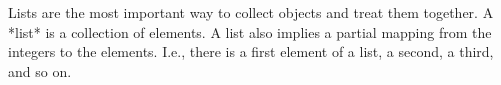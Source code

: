 %

Lists  are the  most  important way  to collect objects  and  treat  them
together.  A *list* is a collection  of elements.  A list  also implies a
partial mapping from the integers  to  the elements.   I.e.,  there is  a
first element of a list, a second, a third, and so on.

